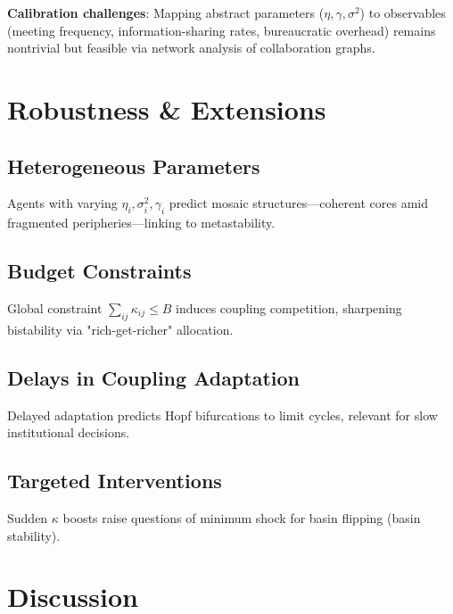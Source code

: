 \documentclass[12pt,a4paper]{article}
\begin{document}
\textbf{Calibration challenges}: Mapping abstract parameters ($\eta, \gamma, \sigma^2$) to observables (meeting frequency, information-sharing rates, bureaucratic overhead) remains nontrivial but feasible via network analysis of collaboration graphs.

\section{Robustness \& Extensions}
\label{sec:extensions}

\subsection{Heterogeneous Parameters}
Agents with varying $\eta_i, \sigma_i^2, \gamma_i$ predict mosaic structures---coherent cores amid fragmented peripheries---linking to metastability.

\subsection{Budget Constraints}
Global constraint $\sum_{ij} \kappa_{ij} \leq B$ induces coupling competition, sharpening bistability via "rich-get-richer" allocation.

\subsection{Delays in Coupling Adaptation}
Delayed adaptation predicts Hopf bifurcations to limit cycles, relevant for slow institutional decisions.

\subsection{Targeted Interventions}
Sudden $\kappa$ boosts raise questions of minimum shock for basin flipping (basin stability).

\section{Discussion}

\begin{center}
\end{center}
\end{document}
